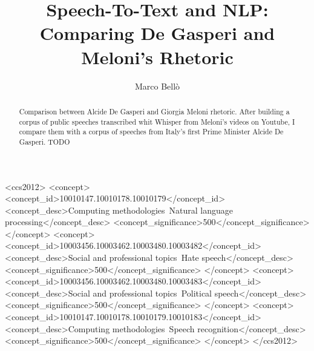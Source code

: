 \documentclass[manuscript,screen,review]{acmart}
\begin{document}
\title{Speech-To-Text and NLP: Comparing De Gasperi and Meloni's Rhetoric}

\author{Marco Bellò}



\renewcommand{\shortauthors}{Bellò}

\begin{abstract}
Comparison between Alcide De Gasperi and Giorgia Meloni rhetoric. After building a corpus of public speeches transcribed whit Whisper from Meloni's videos on Youtube, I compare them with a corpus of speeches from Italy's first Prime Minister Alcide De Gasperi.
TODO
\end{abstract}
\begin{CCSXML}
<ccs2012>
   <concept>
       <concept_id>10010147.10010178.10010179</concept_id>
       <concept_desc>Computing methodologies~Natural language processing</concept_desc>
       <concept_significance>500</concept_significance>
       </concept>
   <concept>
       <concept_id>10003456.10003462.10003480.10003482</concept_id>
       <concept_desc>Social and professional topics~Hate speech</concept_desc>
       <concept_significance>500</concept_significance>
       </concept>
   <concept>
       <concept_id>10003456.10003462.10003480.10003483</concept_id>
       <concept_desc>Social and professional topics~Political speech</concept_desc>
       <concept_significance>500</concept_significance>
       </concept>
   <concept>
       <concept_id>10010147.10010178.10010179.10010183</concept_id>
       <concept_desc>Computing methodologies~Speech recognition</concept_desc>
       <concept_significance>500</concept_significance>
       </concept>
 </ccs2012>
\end{CCSXML}
\end{document}
